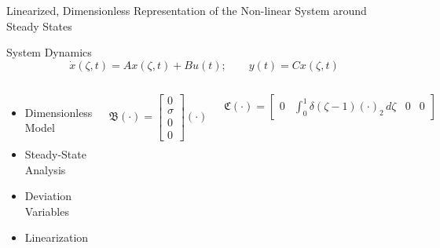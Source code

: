 \documentclass[8pt]{beamer}
\begin{document}
\begin{frame}{Linearized, Dimensionless Representation of the Non-linear System around Steady States}
    
\begin{block}{System Dynamics}
    \begin{equation} \label{eq:state_space}
        \dot{x}(\zeta, t) = A x(\zeta, t) + B u(t); \qquad
        y(t) = C x(\zeta, t)
    \end{equation}
\end{block}

\begin{columns}[t]
\begin{itemize}
    \item Dimensionless Model
    \item Steady-State Analysis
    \item Deviation Variables
    \item Linearization
\end{itemize}
\begin{equation} \label{eq:3_B_operator}
\mathfrak{B} (\cdot) = \begin{bmatrix} 0 \\ \sigma \\ 0 \\ 0 \end{bmatrix} (\cdot)
\end{equation}


\begin{equation} \label{eq:3_C_operator}
\mathfrak{C} (\cdot) = \begin{bmatrix} 0 & \int_0^1 \delta(\zeta - 1)(\cdot)_2\, d\zeta & 0 & 0 \end{bmatrix}
\end{equation}
\end{columns}

\end{frame}
\end{document}
